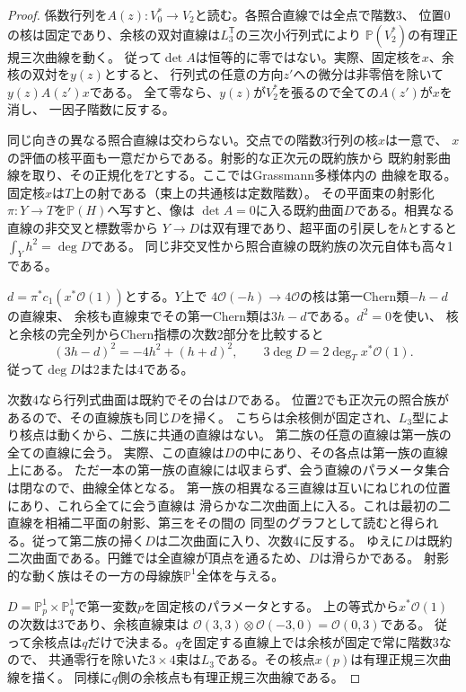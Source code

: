 \begin{proof}
係数行列を$A(z):V_0^*\to V_2$と読む。各照合直線では全点で階数3、
位置0の核は固定であり、余核の双対直線は$L_3^{\mathsf T}$の三次小行列式により
$\mathbb P(V_2^*)$の有理正規三次曲線を動く。
従って$\det A$は恒等的に零ではない。実際、固定核を$x$、余核の双対を$y(z)$とすると、
行列式の任意の方向$z'$への微分は非零倍を除いて$y(z)A(z')x$である。
全て零なら、$y(z)$が$V_2^*$を張るので全ての$A(z')$が$x$を消し、
一因子階数に反する。

同じ向きの異なる照合直線は交わらない。交点での階数3行列の核$x$は一意で、
$x$の評価の核平面も一意だからである。射影的な正次元の既約族から
既約射影曲線を取り、その正規化を$T$とする。ここではGrassmann多様体内の
曲線を取る。固定核$x$は$T$上の射である（束上の共通核は定数階数）。
その平面束の射影化$\pi:Y\to T$を$\mathbb P(H)$へ写すと、像は
$\det A=0$に入る既約曲面$D$である。相異なる直線の非交叉と標数零から
$Y\to D$は双有理であり、超平面の引戻しを$h$とすると$\int_Y h^2=\deg D$である。
同じ非交叉性から照合直線の既約族の次元自体も高々1である。

$d=\pi^*c_1(x^*\mathcal O(1))$とする。$Y$上で
$4\mathcal O(-h)\to4\mathcal O$の核は第一Chern類$-h-d$の直線束、
余核も直線束でその第一Chern類は$3h-d$である。$d^2=0$を使い、
核と余核の完全列からChern指標の次数2部分を比較すると
\[
 (3h-d)^2=-4h^2+(h+d)^2,\qquad 3\deg D=2\deg_T x^*\mathcal O(1).
\]
従って$\deg D$は2または4である。

次数4なら行列式曲面は既約でその台は$D$である。
位置2でも正次元の照合族があるので、その直線族も同じ$D$を掃く。
こちらは余核側が固定され、$L_3$型により核点は動くから、二族に共通の直線はない。
第二族の任意の直線は第一族の全ての直線に会う。
実際、この直線は$D$の中にあり、その各点は第一族の直線上にある。
ただ一本の第一族の直線には収まらず、会う直線のパラメータ集合は閉なので、曲線全体となる。
第一族の相異なる三直線は互いにねじれの位置にあり、これら全てに会う直線は
滑らかな二次曲面上に入る。これは最初の二直線を相補二平面の射影、第三をその間の
同型のグラフとして読むと得られる。従って第二族の掃く$D$は二次曲面に入り、次数4に反する。
ゆえに$D$は既約二次曲面である。円錐では全直線が頂点を通るため、$D$は滑らかである。
射影的な動く族はその一方の母線族$\mathbb P^1$全体を与える。

$D=\mathbb P^1_p\times\mathbb P^1_q$で第一変数$p$を固定核のパラメータとする。
上の等式から$x^*\mathcal O(1)$の次数は3であり、余核直線束は
$\mathcal O(3,3)\otimes\mathcal O(-3,0)=\mathcal O(0,3)$である。
従って余核点は$q$だけで決まる。$q$を固定する直線上では余核が固定で常に階数3なので、
共通零行を除いた$3\times4$束は$L_3$である。その核点$x(p)$は有理正規三次曲線を描く。
同様に$q$側の余核点も有理正規三次曲線である。
\end{proof}


